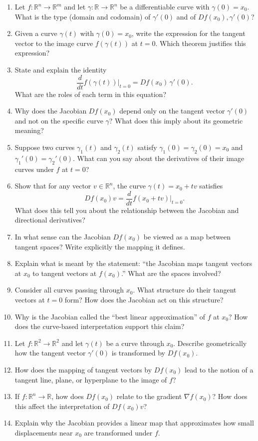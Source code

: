 \begin{enumerate}[resume]
  \item Let \(f : \mathbb{R}^{n} \to \mathbb{R}^{m}\) and let \(\gamma : \mathbb{R}\to \mathbb{R}^{n}\) be a differentiable curve with \(\gamma(0) = x_{0}\). What is the type (domain and codomain) of \(\gamma'(0)\) and of \(Df(x_{0}),\gamma'(0)\)?
  \item Given a curve \(\gamma(t)\) with \(\gamma(0) = x_{0}\), write the expression for the tangent vector to the image curve \(f(\gamma(t))\) at \(t=0\). Which theorem justifies this expression?
  \item State and explain the identity
    \[ \frac{d}{dt}f(\gamma(t)) \bigg|_{t=0}= Df(x_{0})\,\gamma'(0). \]
    What are the roles of each term in this equation?
  \item Why does the Jacobian \(Df(x_{0})\) depend only on the tangent vector \(\gamma'(0)\) and not on the specific curve \(\gamma\)? What does this imply about its geometric meaning?
  \item Suppose two curves \(\gamma_{1}(t)\) and \(\gamma_{2}(t)\) satisfy \(\gamma_{1}(0)=\gamma_{2}(0)=x_{0}\) and \(\gamma_{1}'(0)=\gamma_{2}'(0)\). What can you say about the derivatives of their image curves under \(f\) at \(t=0\)?
  \item Show that for any vector \(v \in \mathbb{R}^{n}\), the curve \(\gamma(t) = x_{0} + t v\) satisfies
    \[ Df(x_{0})v = \frac{d}{dt}f(x_{0} + t v)\bigg|_{t=0}. \]
    What does this tell you about the relationship between the Jacobian and directional derivatives?
  \item In what sense can the Jacobian \(Df(x_{0})\) be viewed as a map between tangent spaces? Write explicitly the mapping it defines.
  \item Explain what is meant by the statement: ``the Jacobian maps tangent vectors at \(x_{0}\) to tangent vectors at \(f(x_{0})\).'' What are the spaces involved?
  \item Consider all curves passing through \(x_{0}\). What structure do their tangent vectors at \(t=0\) form? How does the Jacobian act on this structure?
  \item Why is the Jacobian called the ``best linear approximation'' of \(f\) at \(x_{0}\)? How does the curve-based interpretation support this claim?
  \item Let \(f : \mathbb{R}^{2} \to \mathbb{R}^{2}\) and let \(\gamma(t)\) be a curve through \(x_{0}\). Describe geometrically how the tangent vector \(\gamma'(0)\) is transformed by \(Df(x_{0})\).
  \item How does the mapping of tangent vectors by \(Df(x_{0})\) lead to the notion of a tangent line, plane, or hyperplane to the image of \(f\)?
  \item If \(f : \mathbb{R}^{n} \to \mathbb{R}\), how does \(Df(x_{0})\) relate to the gradient \(\nabla f(x_{0})\)? How does this affect the interpretation of \(Df(x_{0})v\)?
  \item Explain why the Jacobian provides a linear map that approximates how small displacements near \(x_{0}\) are transformed under \(f\).
\end{enumerate}
